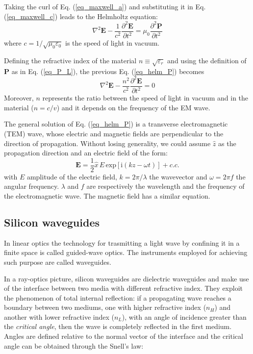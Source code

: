 \documentclass[12pt,a4paper,twoside]{article}
\begin{document}
Taking the curl of Eq. (\ref{eq_maxwell_a}) and substituting it in Eq. (\ref{eq_maxwell_c}) leads to the Helmholtz equation:
\begin{equation}
\nabla^2 \textbf{E} - \frac{1}{c^2}\frac{\partial^2 \textbf{E}}{\partial t^2} = \mu_0\frac{\partial^2 \textbf{P}}{\partial t^2}
\label{eq_helm_P}
\end{equation}
where $c = 1/\sqrt{\mu_0 \varepsilon_0}$ is the speed of light in vacuum.

Defining the refractive index of the material $n \equiv \sqrt{\varepsilon_r}$ and using the definition of \textbf{P} as in Eq. (\ref{eq_P_L}), the previous Eq. (\ref{eq_helm_P}) becomes
\begin{equation}
	\nabla^2 \textbf{E} - \frac{n^2}{c^2}\frac{\partial^2 \textbf{E}}{\partial t^2} = 0
	\label{eq_helm_lin}
\end{equation}
Moreover, $n$ represents the ratio between the speed of light in vacuum and in the material ($n = c/v$) and it depends on the frequency of the EM wave.

The general solution of Eq. (\ref{eq_helm_P}) is a transverse electromagnetic (TEM) wave, whose electric and magnetic fields are perpendicular to the direction of propagation.
Without losing generality, we could assume $\hat{z}$ as the propagation direction and an electric field of the form:
\begin{equation}
	\textbf{E} = \frac{1}{2}\hat{x}\,E\,\mathrm{exp}[\mathrm{i}(kz-\omega t)] + c.c.
	\label{eq_wave}
\end{equation}
with $E$ amplitude of the electric field, $k = 2\pi/\lambda$ the wavevector and $\omega = 2\pi f$ the angular frequency.
$\lambda$ and $f$ are respectively the wavelength and the frequency of the electromagnetic wave.
The magnetic field has a similar equation.

\subsection{Silicon waveguides}
In linear optics the technology for trasmitting a light wave by confining it in a finite space is called guided-wave optics.
The instruments employed for achieving such purpose are called waveguides.

In a ray-optics picture, silicon waveguides are dielectric waveguides and make use of the interface between two media with different refractive index.
They exploit the phenomenon of total internal reflection: if a propagating wave reaches a boundary between two mediums, one with higher refractive index ($n_H$) and another with lower refractive index ($n_L$), with an angle of incidence greater than the \textit{critical angle}, then the wave is completely reflected in the first medium.
Angles are defined relative to the normal vector of the interface and the critical angle can be obtained through the Snell's law:
\end{document}
